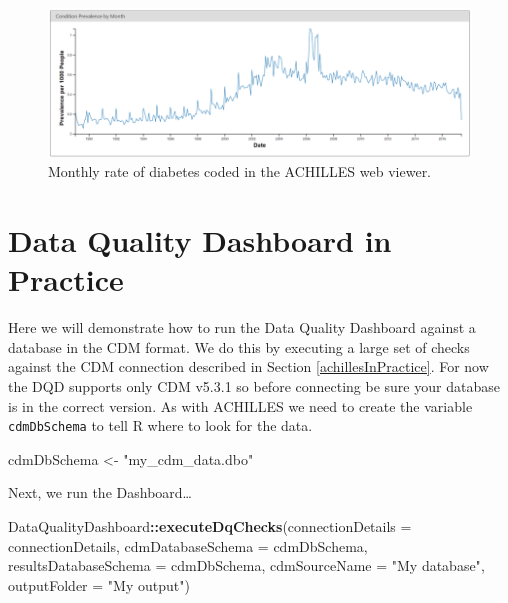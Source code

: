 \documentclass[11pt]{book}
\newenvironment{Shaded}{\begin{snugshade}}{\end{snugshade}}
\newcommand{\KeywordTok}[1]{\textcolor[rgb]{0.13,0.29,0.53}{\textbf{#1}}}
\newcommand{\DataTypeTok}[1]{\textcolor[rgb]{0.13,0.29,0.53}{#1}}
\newcommand{\StringTok}[1]{\textcolor[rgb]{0.31,0.60,0.02}{#1}}
\newcommand{\OperatorTok}[1]{\textcolor[rgb]{0.81,0.36,0.00}{\textbf{#1}}}
\newcommand{\NormalTok}[1]{#1}
\theoremstyle{definition}
\theoremstyle{definition}
\theoremstyle{definition}
\theoremstyle{remark}
\begin{document}
\begin{figure}

{\centering \includegraphics[width=1\linewidth]{images/DataQuality/achillesCodeChange} 

}

\caption{Monthly rate of diabetes coded in the ACHILLES web viewer.}\label{fig:achillesCodeChange}
\end{figure}

\section{Data Quality Dashboard in Practice}\label{dqdInPractice}

Here we will demonstrate how to run the Data Quality Dashboard against a
database in the CDM format. We do this by executing a large set of
checks against the CDM connection described in Section
\ref{achillesInPractice}. For now the DQD supports only CDM v5.3.1 so
before connecting be sure your database is in the correct version. As
with ACHILLES we need to create the variable \texttt{cdmDbSchema} to
tell R where to look for the data.

\begin{Shaded}
\begin{Highlighting}[]
\NormalTok{cdmDbSchema <-}\StringTok{ "my_cdm_data.dbo"}
\end{Highlighting}
\end{Shaded}

Next, we run the Dashboard\ldots{}

\begin{Shaded}
\begin{Highlighting}[]
\NormalTok{DataQualityDashboard}\OperatorTok{::}\KeywordTok{executeDqChecks}\NormalTok{(}\DataTypeTok{connectionDetails =}\NormalTok{ connectionDetails, }
                                      \DataTypeTok{cdmDatabaseSchema =}\NormalTok{ cdmDbSchema, }
                                      \DataTypeTok{resultsDatabaseSchema =}\NormalTok{ cdmDbSchema,}
                                      \DataTypeTok{cdmSourceName =} \StringTok{"My database"}\NormalTok{,}
                                      \DataTypeTok{outputFolder =} \StringTok{"My output"}\NormalTok{)}
\end{Highlighting}
\end{Shaded}
\end{document}
